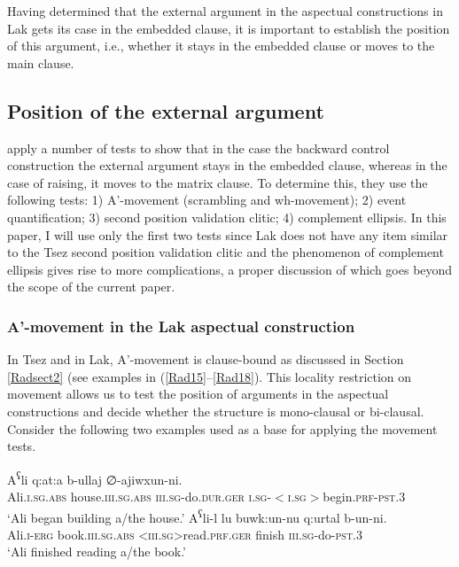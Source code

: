 \documentclass[output=paper]{langscibook}
\begin{document}
Having determined that the external argument in the aspectual constructions in Lak gets its case in the embedded clause, it is important to establish the position of this argument, i.e., whether it stays in the embedded clause or moves to the main clause.

\subsection{Position of the external argument}
\citet{PolinskyPotsdam2002} apply a number of tests to show that in the case the backward control construction the external argument stays in the embedded clause, whereas in the case of raising, it moves to the matrix clause. To determine this, they use the following tests: 1) A'-movement (scrambling and wh-movement); 2) event quantification; 3) second position validation clitic; 4) complement ellipsis. In this paper, I will use only the first two tests since Lak does not have any item similar to the Tsez second position validation clitic and the phenomenon of complement ellipsis gives rise to more complications, a proper discussion of which goes beyond the scope of the current paper.

\subsubsection{A'-movement in the Lak aspectual construction}\label{Radsect:3.2.1}
In Tsez and in Lak, A'-movement is clause-bound as discussed in Section \ref{Radsect2} (see examples in (\ref{Rad15}--\ref{Rad18}).  This locality restriction on movement allows us to test the position of arguments in the aspectual constructions and decide whether the structure is mono-clausal or bi-clausal. Consider the following two examples used as a base for applying the movement tests.

\ea\label{Rad29}
\gll A\textsuperscript{ʕ}li q:at:a b-ullaj ∅-ajiwxun-ni.\\
Ali.\textsc{i.sg.abs} house.\textsc{iii.sg.abs} \textsc{iii.sg}-do.\textsc{dur.ger} \textsc{i.sg-$<$i.sg$>$}begin.\textsc{prf-pst.3}\\
\glt ‘Ali began building a/the house.’
\ex\label{Rad30}
\gll A\textsuperscript{ʕ}li-l lu buwk:un-nu q:urtal b-un-ni.\\
 Ali.\textsc{i-erg} book.\textsc{iii.sg.abs} \textsc{<iii.sg>}read.\textsc{prf.ger} finish \textsc{iii.sg}-do-\textsc{pst.3}\\
\glt ‘Ali finished reading a/the book.’
\z 
\end{document}
